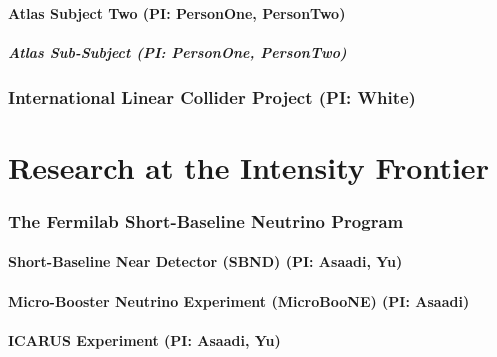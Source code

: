 \documentclass[11pt]{article}
\def\onehead#1{\part{#1}}
\def\twohead#1{\section{#1}}
\def\threehead#1{\subsection{#1}}
\def\fourhead#1{\subsubsection{#1}}
\begin{document}
\threehead{Atlas Subject Two (PI: PersonOne, PersonTwo)}
%

\fourhead{Atlas Sub-Subject (PI: PersonOne, PersonTwo)}
%


\twohead{International Linear Collider Project (PI: White)}






\newpage


\onehead{Research at the Intensity Frontier}







\twohead{The Fermilab Short-Baseline Neutrino Program}


\threehead{Short-Baseline Near Detector (SBND) (PI: Asaadi, Yu)}


\threehead{Micro-Booster Neutrino Experiment (MicroBooNE) (PI: Asaadi)}



\threehead{ICARUS Experiment (PI: Asaadi, Yu)}

\end{document}
